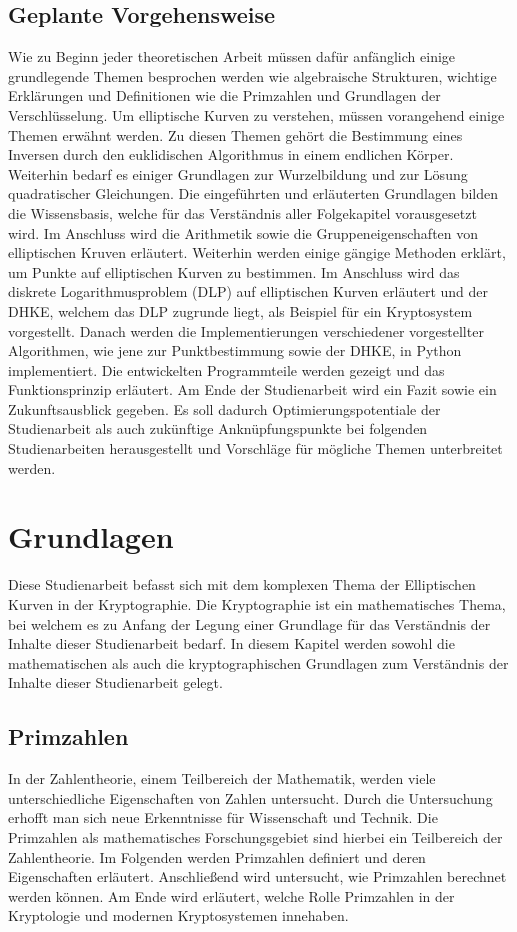 \section{Geplante Vorgehensweise}
Wie zu Beginn jeder theoretischen Arbeit müssen dafür anfänglich einige grundlegende Themen besprochen werden wie algebraische Strukturen, wichtige Erklärungen und Definitionen wie die Primzahlen und Grundlagen der Verschlüsselung. Um elliptische Kurven zu verstehen, müssen vorangehend einige Themen erwähnt werden. Zu diesen Themen gehört die Bestimmung eines Inversen durch den euklidischen Algorithmus in einem endlichen Körper. Weiterhin bedarf es einiger Grundlagen zur Wurzelbildung und zur Lösung quadratischer Gleichungen. Die eingeführten und erläuterten Grundlagen bilden die Wissensbasis, welche für das Verständnis aller Folgekapitel vorausgesetzt wird. Im Anschluss wird die Arithmetik sowie die Gruppeneigenschaften von elliptischen Kruven erläutert. Weiterhin werden einige gängige Methoden erklärt, um Punkte auf elliptischen Kurven zu bestimmen. Im Anschluss wird das diskrete Logarithmusproblem (DLP) auf elliptischen Kurven erläutert und der DHKE, welchem das DLP zugrunde liegt, als Beispiel für ein Kryptosystem vorgestellt. Danach werden die Implementierungen verschiedener vorgestellter Algorithmen, wie jene zur Punktbestimmung sowie der DHKE, in Python implementiert. Die entwickelten Programmteile werden gezeigt und das Funktionsprinzip erläutert. Am Ende der Studienarbeit wird ein Fazit sowie ein Zukunftsausblick gegeben. Es soll dadurch Optimierungspotentiale der Studienarbeit als auch zukünftige Anknüpfungspunkte bei folgenden Studienarbeiten herausgestellt und Vorschläge für mögliche Themen unterbreitet werden.

\chapter{Grundlagen}\label{sec:grundlagen}
Diese Studienarbeit befasst sich mit dem komplexen Thema der Elliptischen Kurven in der Kryptographie. Die Kryptographie ist ein mathematisches Thema, bei welchem es zu Anfang der Legung einer Grundlage für das Verständnis der Inhalte dieser Studienarbeit bedarf. In diesem Kapitel werden sowohl die mathematischen als auch die kryptographischen Grundlagen zum Verständnis der Inhalte dieser Studienarbeit gelegt.

\section{Primzahlen}
In der Zahlentheorie, einem Teilbereich der Mathematik, werden viele unterschiedliche Eigenschaften von Zahlen untersucht. Durch die Untersuchung erhofft man sich neue Erkenntnisse für Wissenschaft und Technik. Die Primzahlen als mathematisches Forschungsgebiet sind hierbei ein Teilbereich der Zahlentheorie. Im Folgenden werden Primzahlen definiert und deren Eigenschaften erläutert. Anschließend wird untersucht, wie Primzahlen berechnet werden können. Am Ende wird erläutert, welche Rolle Primzahlen in der Kryptologie und modernen Kryptosystemen innehaben.

